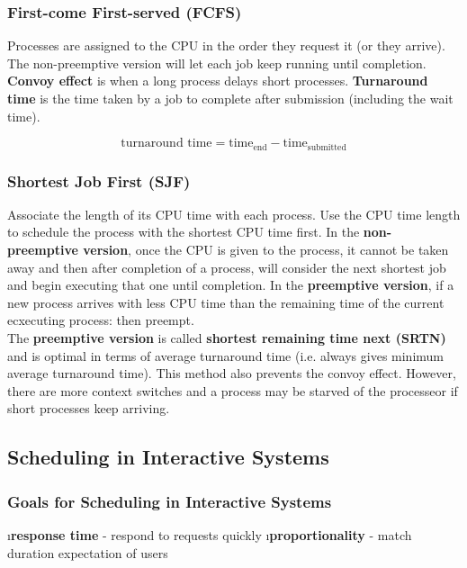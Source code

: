 \documentclass{article}
\begin{document}
    \subsubsection{First-come First-served (FCFS)}

    Processes are assigned to the CPU in the order they request it (or they arrive). The non-preemptive version will let each job keep running until completion. \textbf{Convoy effect} is when a long process delays short processes. \textbf{Turnaround time} is the time taken by a job to complete after submission (including the wait time). 

    $$\textrm{turnaround time} = \textrm{time}_{\textrm{end}} - \textrm{time}_{\textrm{submitted}}$$
    
    \subsubsection{Shortest Job First (SJF)}

    Associate the length of its CPU time with each process. Use the CPU time length to schedule the process with the shortest CPU time first. In the \textbf{non-preemptive version}, once the CPU is given to the process, it cannot be taken away and then after completion of a process, will consider the next shortest job and begin executing that one until completion. In the \textbf{preemptive version}, if a new process arrives with less CPU time than the remaining time of the current ecxecuting process: then preempt. \\

    \noindent The \textbf{preemptive version} is called \textbf{shortest remaining time next (SRTN)} and is optimal in terms of average turnaround time (i.e. always gives minimum average turnaround time). This method also prevents the convoy effect. However, there are more context switches and a process may be starved of the processeor if short processes keep arriving. 

\subsection{Scheduling in Interactive Systems}
    
    \subsubsection{Goals for Scheduling in Interactive Systems}

    \bl
    \i \textbf{response time} - respond to requests quickly
    \i \textbf{proportionality} - match duration expectation of users
    \el
\end{document}
